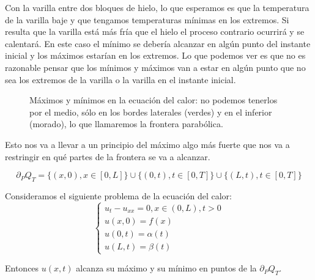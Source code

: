 	 Con la varilla entre dos bloques de hielo, lo que esperamos es que la temperatura de la varilla baje y que tengamos temperaturas mínimas en los extremos. Si resulta que la varilla está más fría que el hielo el proceso contrario ocurrirá y se calentará. En este caso el mínimo se debería alcanzar en algún punto del instante inicial y los máximos estarían en los extremos. Lo que podemos ver es que no es razonable pensar que los mínimos y máximos van a estar en algún punto que no sea los extremos de la varilla o la varilla en el instante inicial.

	 \begin{figure}[hbtp]
	 \centering
	 \caption{Máximos y mínimos en la ecuación del calor: no podemos tenerlos por el medio, sólo en los bordes laterales (verdes) y en el inferior (morado), lo que llamaremos la frontera parabólica.}
	 \label{fig:EcCalorMaximosMinimos}
	 \end{figure}

	 Esto nos va a llevar a un principio del máximo algo más fuerte que nos va a restringir en qué partes de la frontera se va a alcanzar.

	 \begin{defn} \label{def:FronteraParabolica}
	 	\[\partial_P Q_T = \{(x,0), x \in [0,L]\} \cup \{(0,t), t \in [0,T]\} \cup \{(L,t), t \in [0,T]\}\]
	 \end{defn}

	 \begin{theorem} \label{thm:MaximoDebilCalor} Consideramos el siguiente problema de la ecuación del calor:
	 	\[ \begin{cases}
	 		u_{t} - u_{xx} = 0, x \in (0,L), t > 0 \\
			u(x,0) = f(x) \\
			u(0,t) = \alpha(t) \\
			u(L,t) = \beta(t)
	 	\end{cases}\]

	 	Entonces $u(x,t)$ alcanza su máximo y su mínimo en puntos de la  $\partial_P Q_T$.
	 \end{theorem}

